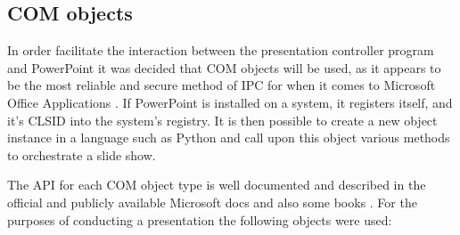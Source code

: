 \documentclass[12pt, fleqn, a4paper]{article}
\begin{document}
\subsection{COM objects}
In order facilitate the interaction between the presentation controller program and PowerPoint it was decided that COM objects will be used, as it appears to be the most reliable and secure method of IPC for when it comes to Microsoft Office Applications \citep{stevewhims}. If PowerPoint is installed on a system, it registers itself, and it's CLSID into the system's registry. It is then possible to create a new object instance in a language such as Python and call upon this object various methods to orchestrate a slide show.\par
The API for each COM object type is well documented and described in the official and publicly available Microsoft docs and also some books \citep{box1998essential}. For the purposes of conducting a presentation the following objects were used:
\end{document}
